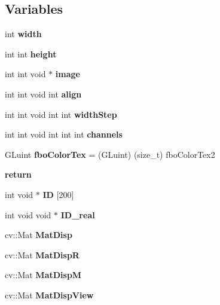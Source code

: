 \subsection*{Variables}
\begin{DoxyCompactItemize}
\item 
int {\bfseries width}\label{likelihood_8cpp_a2474a5474cbff19523a51eb1de01cda4}

\item 
int int {\bfseries height}\label{likelihood_8cpp_adc7b4b8a6ef510e136071efbc9cd9a58}

\item 
int int void $\ast$ {\bfseries image}\label{likelihood_8cpp_af96f66398b26df63fa34b19851f75a0f}

\item 
int int void int {\bfseries align}\label{likelihood_8cpp_ac7708d246936a1a04e21e20a53f914ee}

\item 
int int void int int {\bfseries width\+Step}\label{likelihood_8cpp_a36fcdb672fd05377b7a97714df2bf178}

\item 
int int void int int int {\bfseries channels}
\item 
G\+Luint {\bfseries fbo\+Color\+Tex} = (G\+Luint) (size\+\_\+t) fbo\+Color\+Tex2\label{likelihood_8cpp_a68f26998b31b50787befdfb8d6ba8e84}

\item 
{\bfseries return}\label{likelihood_8cpp_a9717e7bbecb906637e86cef6da3d83c2}

\item 
int void $\ast$ {\bfseries ID} \mbox{[}200\mbox{]}\label{likelihood_8cpp_a2ffb5fd2b555085c754522b95a99fc76}

\item 
int void void $\ast$ {\bfseries I\+D\+\_\+real}\label{likelihood_8cpp_ad433c1debd12d67692de2839ab367ee4}

\item 
cv\+::\+Mat {\bfseries Mat\+Disp}\label{likelihood_8cpp_a6c2131757d98a44c70bcc3bfc0445806}

\item 
cv\+::\+Mat {\bfseries Mat\+DispR}\label{likelihood_8cpp_a8b2dc2c4155b98b56d86b0addbe0d0d4}

\item 
cv\+::\+Mat {\bfseries Mat\+DispM}\label{likelihood_8cpp_af0f53481cd2fd57181d74ad3b2127f4e}

\item 
cv\+::\+Mat {\bfseries Mat\+Disp\+View}\label{likelihood_8cpp_acd465b56a09c9bc999d9f617ddd809f0}


\end{DoxyCompactItemize}
